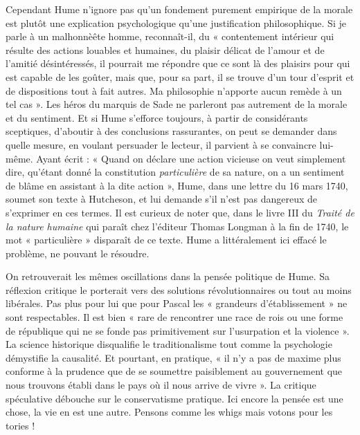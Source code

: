 Cependant Hume n’ignore pas qu’un fondement 
purement empirique de la morale est plutôt une explication
psychologique qu’une justification philosophique. Si je
parle à un malhonnèête homme, reconnaît-il, du « contentement 
intérieur qui résulte des actions louables et
humaines, du plaisir délicat de l’amour et de l’amitié
désintéressés, il pourrait me répondre que ce sont là des
plaisirs pour qui est capable de les goûter, mais que, pour
sa part, il se trouve d’un tour d’esprit et de dispositions
tout à fait autres. Ma philosophie n’apporte aucun remède
à un tel cas ». Les héros du marquis de Sade ne parleront
pas autrement de la morale et du sentiment. Et si Hume
s'efforce toujours, à partir de considérants sceptiques,
d'aboutir à des conclusions rassurantes, on peut se demander 
dans quelle mesure, en voulant persuader le lecteur,
il parvient à se convaincre lui-même. Ayant écrit : « Quand
on déclare une action vicieuse on veut simplement dire,
qu'étant donné la constitution {\it particulière} de sa nature,
on a un sentiment de blâme en assistant à la dite action »,
Hume, dans une lettre du 16 mars 1740, soumet son texte
à Hutcheson, et lui demande s’il n’est pas dangereux de
s’exprimer en ces termes. Il est curieux de noter que, dans
le livre III du {\it Traité de la nature humaine} qui paraît chez
l'éditeur Thomas Longman à la fin de 1740, le mot « particulière » 
disparaît de ce texte. Hume a littéralement ici
effacé le problème, ne pouvant le résoudre.

On retrouverait les mêmes oscillations dans la pensée
politique de Hume. Sa réflexion critique le porterait vers
des solutions révolutionnaires ou tout au moins libérales.
Pas plus pour lui que pour Pascal les « grandeurs d’établissement » 
ne sont respectables. Il est bien « rare de
rencontrer une race de rois ou une forme de république qui
ne se fonde pas primitivement sur l’usurpation et la
violence ». La science historique disqualifie le traditionalisme 
tout comme la psychologie démystifie la causalité.
Et pourtant, en pratique, « il n’y a pas de maxime plus
conforme à la prudence que de se soumettre paisiblement
au gouvernement que nous trouvons établi dans le pays
où il nous arrive de vivre ». La critique spéculative débouche
sur le conservatisme pratique. Ici encore la pensée est une
chose, la vie en est une autre. Pensons comme les whigs
mais votons pour les tories !
